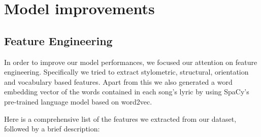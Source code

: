 \chapter{Model improvements}


\section{Feature Engineering}
In order to improve our model performances, we focused our attention on feature engineering. Specifically we tried to extract stylometric, structural, orientation and vocabulary based features\cite{features}. Apart from this we also generated a word embedding vector of the words contained in each song's lyric by using SpaCy's\cite{spacy} pre-trained language model based on word2vec\cite{word2vec}.\par

Here is a comprehensive list of the features we extracted from our dataset, followed by a brief description:

